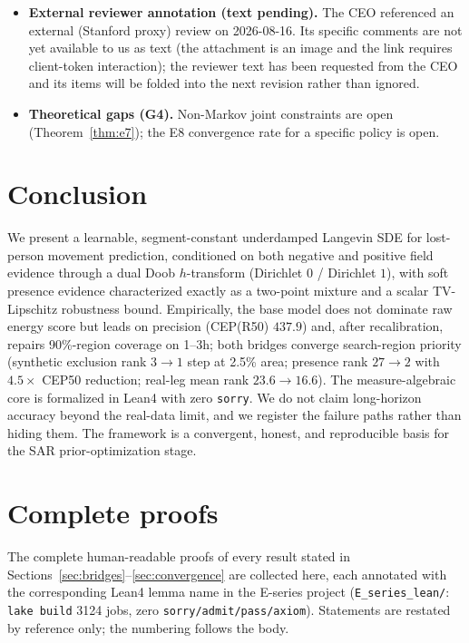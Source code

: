 \documentclass[11pt]{article}
\begin{document}
\begin{itemize}
the SAR terrain-preference literature; it is registered in the RC failure ledger
(FL-326-arm17t) as a data/representation limitation rather than a model conclusion.
\item \textbf{External reviewer annotation (text pending).} The CEO referenced an
external (\mbox{Stanford} proxy) review on 2026-08-16. Its specific comments are not yet
available to us as text (the attachment is an image and the link requires client-token
interaction); the reviewer text has been requested from the CEO and its items will be
folded into the next revision rather than ignored.
\item \textbf{Theoretical gaps (G4).} Non-Markov joint constraints are open
(Theorem~\ref{thm:e7}); the E8 convergence rate for a specific policy is open.
\end{itemize}

\section{Conclusion}
\label{sec:conclusion}
We present a learnable, segment-constant underdamped Langevin SDE for
lost-person movement prediction, conditioned on both negative and positive
field evidence through a dual Doob $h$-transform (Dirichlet $0$ / Dirichlet
$1$), with soft presence evidence characterized exactly as a two-point mixture
and a scalar TV-Lipschitz robustness bound. Empirically, the base model does
not dominate raw energy score but leads on precision (CEP(R50) $437.9$) and,
after recalibration, repairs 90\%-region coverage on 1--3h; both bridges
converge search-region priority (synthetic exclusion rank $3\to1$ step at
2.5\% area; presence rank $27\to2$ with $4.5\times$ CEP50 reduction; real-leg
mean rank $23.6\to16.6$). The measure-algebraic core is formalized in Lean4
with zero \texttt{sorry}. We do not claim long-horizon accuracy beyond the
real-data limit, and we register the failure paths rather than hiding them.
The framework is a convergent, honest, and reproducible basis for the SAR
prior-optimization stage.

\appendix
\section{Complete proofs}
\label{app:proofs}
The complete human-readable proofs of every result stated in
Sections~\ref{sec:bridges}--\ref{sec:convergence} are collected here, each annotated with
the corresponding Lean4 lemma name in the E-series project (\texttt{E\_series\_lean/}:
\texttt{lake build} 3124 jobs, zero \texttt{sorry/admit/pass/axiom}). Statements are
restated by reference only; the numbering follows the body.
\end{document}
